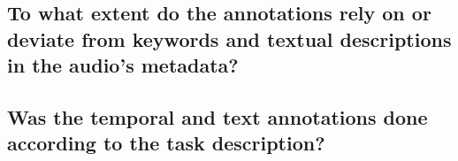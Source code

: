 \subsection{To what extent do the annotations rely on or deviate from keywords and textual descriptions in the audio’s metadata?}
\label{sec:Case Study:b}



\subsection{Was the temporal and text annotations done according to the task description?}
\label{sec:Case Study:c}





